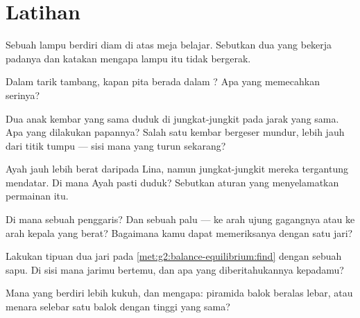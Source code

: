 \section{Latihan}

\begin{exercise}[$\star$]\label{exo:g2:balance-equilibrium:1}
Sebuah lampu berdiri diam di atas meja belajar. Sebutkan dua  yang
bekerja padanya dan katakan mengapa lampu itu tidak bergerak.
\end{exercise}

\begin{exercise}[$\star$]\label{exo:g2:balance-equilibrium:2}
Dalam tarik tambang, kapan pita berada dalam ? Apa yang
memecahkan serinya?
\end{exercise}

\begin{exercise}[$\star$]\label{exo:g2:balance-equilibrium:3}
Dua anak kembar yang sama duduk di jungkat-jungkit pada jarak yang
sama. Apa yang dilakukan papannya? Salah satu kembar bergeser mundur,
lebih jauh dari titik tumpu --- sisi mana yang turun sekarang?
\end{exercise}

\begin{exercise}[$\star$]\label{exo:g2:balance-equilibrium:4}
Ayah jauh lebih berat daripada Lina, namun jungkat-jungkit mereka
tergantung mendatar. Di mana Ayah pasti duduk? Sebutkan aturan yang
menyelamatkan permainan itu.
\end{exercise}

\begin{exercise}[$\star$]\label{exo:g2:balance-equilibrium:5}
Di mana  sebuah penggaris? Dan sebuah palu --- ke arah
ujung gagangnya atau ke arah kepala yang berat? Bagaimana kamu dapat
memeriksanya dengan satu jari?
\end{exercise}

\begin{exercise}[$\star$]\label{exo:g2:balance-equilibrium:6}
Lakukan tipuan dua jari pada \cref{met:g2:balance-equilibrium:find}
dengan sebuah sapu. Di sisi mana jarimu bertemu, dan apa yang
diberitahukannya kepadamu?
\end{exercise}

\begin{exercise}[$\star$]\label{exo:g2:balance-equilibrium:7}
Mana yang berdiri lebih kukuh, dan mengapa: piramida balok beralas
lebar, atau menara selebar satu balok dengan tinggi yang sama?
\end{exercise}

